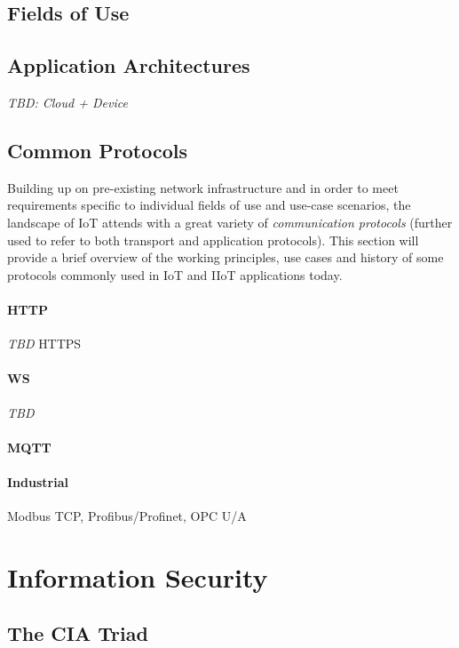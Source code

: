 \subsection{Fields of Use}
\subsection{Application Architectures}
\emph{TBD: Cloud + Device}
\subsection{Common Protocols}
\label{sec:iot-common-protocols}
Building up on pre-existing network infrastructure and in order to meet requirements specific to individual fields of use and use-case scenarios, the landscape of \ac{IoT} attends with a great variety of \emph{communication protocols} (further used to refer to both transport and application protocols). This section will provide a brief overview of the working principles, use cases and history of some protocols commonly used in \ac{IoT} and \ac{IIoT} applications today.
\paragraph{\ac{HTTP}} \emph{TBD} %
\ac{HTTPS}
\paragraph{\ac{WS}} \emph{TBD}

\paragraph{\ac{MQTT}}
\cite{gupta_banks_2015}

\paragraph{Industrial} Modbus \ac{TCP}, Profibus/Profinet, \ac{OPC U/A}

\section{Information Security}
\label{sec:information-security}
\subsection{The CIA Triad}

